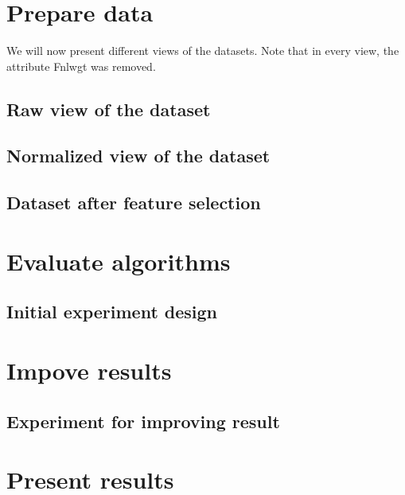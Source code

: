 \chapter{Prepare data}
We will now present different views of the datasets. Note that in every view, the attribute Fnlwgt was removed.
\section{Raw view of the dataset}
\section{Normalized view of the dataset}
\section{Dataset after feature selection}

\chapter{Evaluate algorithms}
\section{Initial experiment design}

\chapter{Impove results}
\section{Experiment for improving result}

\chapter{Present results}